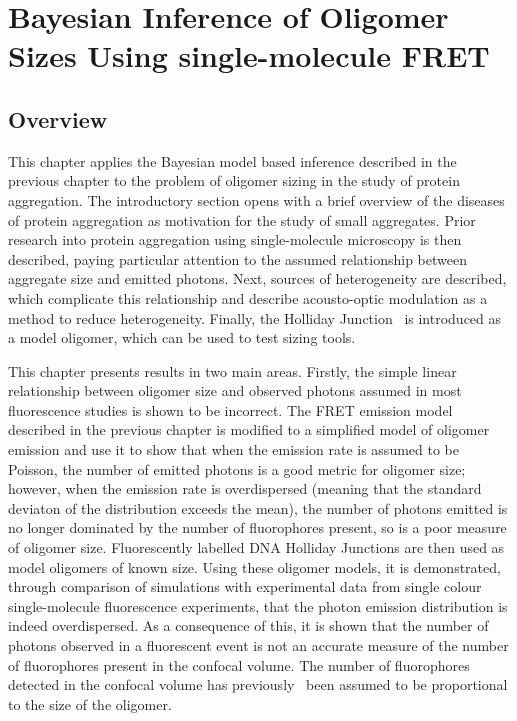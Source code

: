 \chapter{Bayesian Inference of Oligomer Sizes Using single-molecule FRET}
\label{chap:sizing}

\section{Overview}
This chapter applies the Bayesian model based inference described in the previous chapter to the problem of oligomer sizing in the study of protein aggregation. The introductory section opens with a brief overview of the diseases of protein aggregation as motivation for the study of small aggregates. Prior research into protein aggregation using single-molecule microscopy is then described, paying particular attention to the assumed relationship between aggregate size and emitted photons. Next, sources of heterogeneity are described, which complicate this relationship and describe acousto-optic modulation as a method to reduce heterogeneity. Finally, the Holliday Junction~\cite{holliday1964} is introduced as a model oligomer, which can be used to test sizing tools.

This chapter presents results in two main areas. Firstly, the simple linear relationship between oligomer size and observed photons assumed in most fluorescence studies is shown to be incorrect. The FRET emission model described in the previous chapter is modified to a simplified model of oligomer emission and use it to show that when the emission rate is assumed to be Poisson, the number of emitted photons is a good metric for oligomer size; however, when the emission rate is overdispersed (meaning that the standard deviaton of the distribution exceeds the mean), the number of photons emitted is no longer dominated by the number of fluorophores present, so is a poor measure of oligomer size. Fluorescently labelled DNA Holliday Junctions are then used as model oligomers of known size. Using these oligomer models, it is demonstrated, through comparison of simulations with experimental data from single colour single-molecule fluorescence experiments, that the photon emission distribution is indeed overdispersed. As a consequence of this, it is shown that the number of photons observed in a fluorescent event is not an accurate measure of the number of fluorophores present in the confocal volume. The number of fluorophores detected in the confocal volume has previously~\cite{orte08, cremades2012} been assumed to be proportional to the size of the oligomer. 

